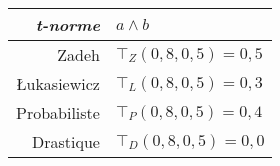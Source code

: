 \begin{tabular}{rl}
  \toprule
  \emph{t-norme} & \(a \wedge{} b\) \\
  \midrule
  Zadeh & \(⊤_Z(0,8, 0,5) = 0,5 \) \\
   Łukasiewicz & \(⊤_L(0,8, 0,5) = 0,3\) \\
  Probabiliste & \(⊤_P(0,8,0,5) = 0,4 \) \\
  Drastique & \(⊤_D(0,8, 0,5) = 0,0 \) \\
  \bottomrule
\end{tabular}